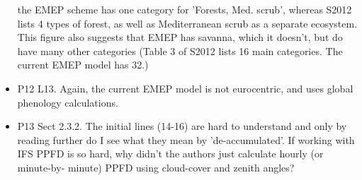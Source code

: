 \documentclass{scrartcl}
\begin{document}
\begin{itemize}
{the EMEP scheme has one category for ’Forests, Med. scrub’, whereas S2012
lists 4 types of forest, as well as Mediterranean scrub as a separate ecosystem.
This figure also suggests that EMEP has savanna, which it doesn’t, but do have
many other categories (Table 3 of S2012 lists 16 main categories. The current
EMEP model has 32.)}
\item {\color{blue}P12 L13. Again, the current EMEP model is not eurocentric, and uses global
phenology calculations.}
\item {\color{blue}P13 Sect 2.3.2. The initial lines (14-16) are hard to understand and only by
reading further do I see what they mean by ’de-accumulated’. If working with
IFS PPFD is so hard, why didn’t the authors just calculate hourly (or minute-by-
minute) PPFD using cloud-cover and zenith angles?}

\end{itemize}
\newpage
\end{document}
